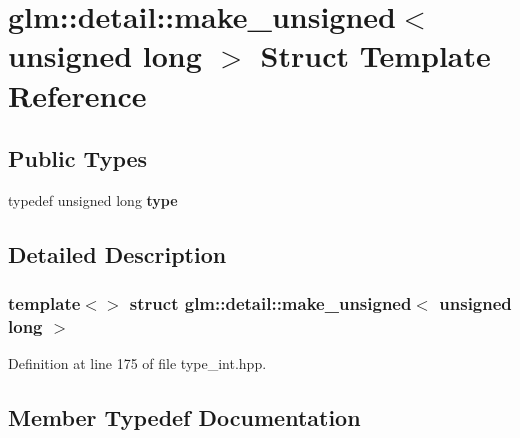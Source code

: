 \hypertarget{structglm_1_1detail_1_1make__unsigned_3_01unsigned_01long_01_4}{}\section{glm\+:\+:detail\+:\+:make\+\_\+unsigned$<$ unsigned long $>$ Struct Template Reference}
\label{structglm_1_1detail_1_1make__unsigned_3_01unsigned_01long_01_4}
\subsection*{Public Types}
\begin{DoxyCompactItemize}
\item 
\mbox{\label{structglm_1_1detail_1_1make__unsigned_3_01unsigned_01long_01_4_a8894ccd179135bda131b42cf10e58362}} 
typedef unsigned long {\bfseries type}
\end{DoxyCompactItemize}


\subsection{Detailed Description}
\subsubsection*{template$<$$>$\newline
struct glm\+::detail\+::make\+\_\+unsigned$<$ unsigned long $>$}



Definition at line 175 of file type\+\_\+int.\+hpp.



\subsection{Member Typedef Documentation}
\mbox{\label{structglm_1_1detail_1_1make__unsigned_3_01unsigned_01long_01_4_a8894ccd179135bda131b42cf10e58362}} 
